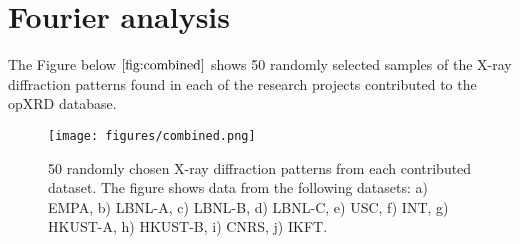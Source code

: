 \documentclass[a4paper]{article}
\begin{document}
\section{Fourier analysis}
The Figure below $\eqref{fig:combined}$ shows 50 randomly selected samples of the X-ray diffraction patterns found in each of the research projects contributed to the opXRD database.

\begin{figure}[!htb]
    \centering
    \texttt{[image: figures/combined.png]}
    \caption{50 randomly chosen X-ray diffraction patterns from each contributed dataset. The figure shows data from the following datasets: a) EMPA, b) LBNL-A, c) LBNL-B, d) LBNL-C, e) USC, f) INT, g) HKUST-A, h) HKUST-B, i) CNRS, j) IKFT.}
    \label{fig:combined}
\end{figure}

\pagebreak
\end{document}
